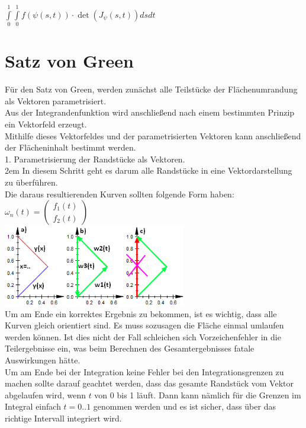 \documentclass[11pt,final]{scrreprt}
\begin{document}
$ \int\limits_0^1\int\limits_0^1 f(\psi(s, t))\cdot\det(J_{\psi}(s, t)) dsdt $\\

\section{Satz von Green}


Für den Satz von Green, werden zunächst alle Teilstücke der Flächenumrandung als Vektoren parametrisiert.\\
Aus der Integrandenfunktion wird anschließend nach einem bestimmten Prinzip ein Vektorfeld erzeugt.\\
Mithilfe dieses Vektorfeldes und der parametrisierten Vektoren kann anschließend der Flächeninhalt bestimmt werden.\\

1. Parametrisierung der Randstücke als Vektoren.\\

\begingroup
\leftskip2em 
In diesem Schritt geht es darum alle Randstücke in eine Vektordarstellung zu überführen.\\
Die daraus resultierenden Kurven sollten folgende Form haben:\\
$\omega_n(t) = \left(\begin{matrix}
f_1(t)\\f_2(t)
\end{matrix}\right)$\\

\includegraphics[width=8cm]{images/flaechenintegral/parametrisierung.png}\\

Um am Ende ein korrektes Ergebnis zu bekommen, ist es wichtig, dass alle Kurven gleich orientiert sind. Es muss sozusagen die Fläche einmal umlaufen werden können. Ist dies nicht der Fall schleichen sich Vorzeichenfehler in die Teilergebnisse ein, was beim Berechnen des Gesamtergebnisses fatale Auswirkungen hätte.\\

Um am Ende bei der Integration keine Fehler bei den Integrationsgrenzen zu machen sollte darauf geachtet werden, dass das gesamte Randstück vom Vektor abgelaufen wird, wenn $t$ von 0 bis 1 läuft. Dann kann nämlich für die Grenzen im Integral einfach $t=0..1$ genommen werden und es ist sicher, dass über das richtige Intervall integriert wird.\\
\par	
\endgroup
\end{document}
